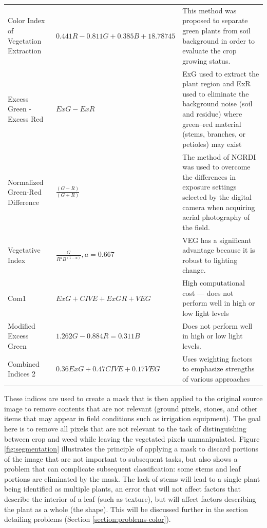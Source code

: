 \documentclass[letterpaper, notitlepage]{report}
\begin{document}
{{\begin{longtable}{x{\dimexpr.25\tabcolsep}
                  x{\dimexpr.35\tabcolsep}
                  x{\dimexpr.4\tabcolsep}}
		Color Index of Vegetation Extraction      
		& $0.441 R - 0.811 G + 0.385 B + 18.78745$
		& This method was proposed to separate green plants from soil background in order to evaluate the crop growing status.
\tabularnewline\addlinespace

		Excess Green - Excess Red   
		& $ExG - ExR$ 
		& ExG used to extract the plant region and ExR used to eliminate the background noise (soil and residue) where green–red material (stems, branches, or petioles) may exist
\tabularnewline\addlinespace

		Normalized Green-Red Difference    
		& $\frac {(G - R)} {(G + R)}$ 
		& The method of NGRDI was used to overcome the differences in exposure settings selected by the digital camera when acquiring aerial photography of the field. 
\tabularnewline\addlinespace

		Vegetative Index      
		& $\frac {G} {R^aB^{(1-a)}}, a = 0.667$ 
		& VEG has a significant advantage because it is robust to lighting change.
\tabularnewline\addlinespace

		Com1   
		& $ExG + CIVE + ExGR + VEG$ 
		& High computational cost --- does not perform well in high or low light levels
\tabularnewline\addlinespace

		Modified Excess Green      
		& $1.262G - 0.884R = 0.311B$ 
		& Does not perform well in high or low light levels. 
\tabularnewline\addlinespace

		Combined Indices 2      
		& $0.36ExG + 0.47CIVE + 0.17VEG$ 
		& Uses weighting factors to emphasize strengths of various approaches
\label{table:indices}
\end{longtable}
}

These indices are used to create a mask that is then applied to the original source image to remove contents that are not relevant (ground pixels, stones, and other items that may appear in field conditions such as irrigation equipment). The goal here is to remove all pixels that are not relevant to the task of distinguishing between crop and weed while leaving the vegetated pixels unmanipulated.  Figure \ref{fig:segmentation} illustrates the principle of applying a mask to discard portions of the image that are not important to subsequent tasks, but also shows a problem that can complicate subsequent classification: some stems and leaf portions are eliminated by the mask. The lack of stems will lead to a single plant being identified as multiple plants, an error that will not affect factors that describe the interior of a leaf (such as texture), but will affect factors describing the plant as a whole (the shape). This will be discussed further in the section detailing problems (Section \ref{section:problems-color}).

}
\end{document}
